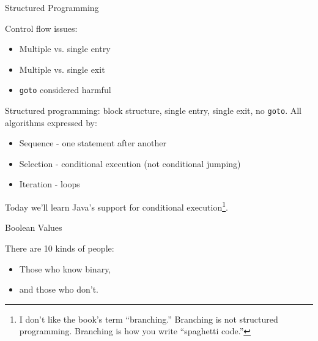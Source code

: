 \documentclass{beamer}
\author[Chris Simpkins]
{Christopher Simpkins \\\texttt{chris.simpkins@gatech.edu}}
\institute[Georgia Tech] %
\date{}
\begin{document}
\begin{frame}
  \titlepage
\end{frame}

\begin{frame}[fragile]{Structured Programming}


Control flow issues:
\begin{itemize}
\item Multiple vs. single entry
\item Multiple vs. single exit
\item {\tt goto} considered harmful
\end{itemize}

Structured programming: block structure, single entry, single exit, no {\tt goto}.  All algorithms expressed by:
\begin{itemize}
\item Sequence - one statement after another
\item Selection - conditional execution (not conditional jumping)
\item Iteration - loops
\end{itemize}

Today we'll learn Java's support for conditional execution\footnote{I
  don't like the book's term ``branching.''  Branching is not
  structured programming.  Branching is how you write ``spaghetti code.''}.

\end{frame}


\begin{frame}[fragile]{Boolean Values}


There are 10 kinds of people:
\pause
\begin{itemize}
\item Those who know binary,
\pause
\item and those who don't.
\end{itemize}


\end{frame}
\end{document}
